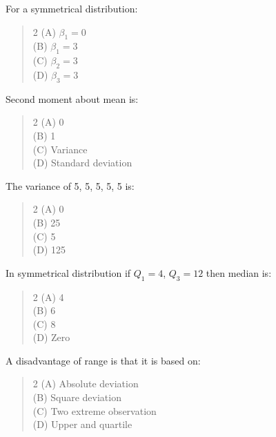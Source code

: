 \documentclass[11pt,a4paper]{article}
\begin{document}
\begin{mcqlist}
\item For a symmetrical distribution:
\begin{quote}\begin{multicols}{2}
\noindent (A) $\beta_1=0$ \\
(B) $\beta_1=3$ \\
(C) $\beta_2=3$ \\
(D) $\beta_3=3$
\end{multicols}\end{quote}

\item Second moment about mean is:
\begin{quote}\begin{multicols}{2}
\noindent (A) 0 \\
(B) 1 \\
(C) Variance \\
(D) Standard deviation
\end{multicols}\end{quote}

\item The variance of 5, 5, 5, 5, 5 is:
\begin{quote}\begin{multicols}{2}
\noindent (A) 0 \\
(B) 25 \\
(C) 5 \\
(D) 125
\end{multicols}\end{quote}

\item In symmetrical distribution if $Q_1=4$, $Q_3=12$ then median is:
\begin{quote}\begin{multicols}{2}
\noindent (A) 4 \\
(B) 6 \\
(C) 8 \\
(D) Zero
\end{multicols}\end{quote}

\item A disadvantage of range is that it is based on:
\begin{quote}\begin{multicols}{2}
\noindent (A) Absolute deviation \\
(B) Square deviation \\
(C) Two extreme observation \\
(D) Upper and quartile
\end{multicols}\end{quote}


\end{mcqlist}
\end{document}
